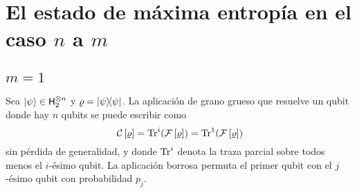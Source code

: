 \section{El estado de máxima entropía en el caso $n$ a $m$}
\subsection{$m=1$}
Sea $\ket{\psi}\in{\sf H}_{2}^{\otimes n}$ y $\varrho=\dyad{\psi}$. La aplicación de grano grueso que resuelve un qubit donde hay $n$ qubits se puede escribir como
\begin{equation*}
    \mathcal{C}\left[\varrho\right]=\Tr^{i}(\mathcal{F}\left[\varrho\right])=\Tr^{1}(\mathcal{F}\left[\varrho\right])
\end{equation*}
sin pérdida de generalidad, y donde $\Tr^{i}$ denota la traza parcial sobre todos menos el $i$-ésimo qubit. La aplicación borrosa permuta el primer qubit con el $j$-ésimo qubit con probabilidad $p_{j}$.
\newpage